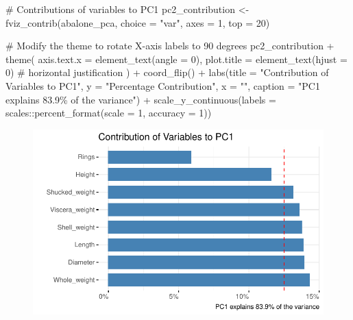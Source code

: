\documentclass[
  letterpaper,
  DIV=11,
  numbers=noendperiod]{scrreprt}
\newenvironment{Shaded}{\begin{snugshade}}{\end{snugshade}}
\newcommand{\AttributeTok}[1]{\textcolor[rgb]{0.40,0.45,0.13}{#1}}
\newcommand{\CommentTok}[1]{\textcolor[rgb]{0.37,0.37,0.37}{#1}}
\newcommand{\DecValTok}[1]{\textcolor[rgb]{0.68,0.00,0.00}{#1}}
\newcommand{\FunctionTok}[1]{\textcolor[rgb]{0.28,0.35,0.67}{#1}}
\newcommand{\NormalTok}[1]{\textcolor[rgb]{0.00,0.23,0.31}{#1}}
\newcommand{\OtherTok}[1]{\textcolor[rgb]{0.00,0.23,0.31}{#1}}
\newcommand{\SpecialCharTok}[1]{\textcolor[rgb]{0.37,0.37,0.37}{#1}}
\newcommand{\StringTok}[1]{\textcolor[rgb]{0.13,0.47,0.30}{#1}}
\begin{document}
\begin{Shaded}
\begin{Highlighting}[]
\CommentTok{\# Contributions of variables to PC1}
\NormalTok{pc2\_contribution }\OtherTok{\textless{}{-}} \FunctionTok{fviz\_contrib}\NormalTok{(abalone\_pca, }\AttributeTok{choice =} \StringTok{"var"}\NormalTok{, }\AttributeTok{axes =} \DecValTok{1}\NormalTok{, }\AttributeTok{top =} \DecValTok{20}\NormalTok{)}

\CommentTok{\# Modify the theme to rotate X{-}axis labels to 90 degrees}
\NormalTok{pc2\_contribution }\SpecialCharTok{+}
  \FunctionTok{theme}\NormalTok{(}
    \AttributeTok{axis.text.x =} \FunctionTok{element\_text}\NormalTok{(}\AttributeTok{angle =} \DecValTok{0}\NormalTok{),}
    \AttributeTok{plot.title =} \FunctionTok{element\_text}\NormalTok{(}\AttributeTok{hjust =} \DecValTok{0}\NormalTok{)  }\CommentTok{\# horizontal justification}
\NormalTok{  ) }\SpecialCharTok{+}
  \FunctionTok{coord\_flip}\NormalTok{() }\SpecialCharTok{+}
  \FunctionTok{labs}\NormalTok{(}\AttributeTok{title =} \StringTok{"Contribution of Variables to PC1"}\NormalTok{,}
       \AttributeTok{y =} \StringTok{"Percentage Contribution"}\NormalTok{,}
       \AttributeTok{x =} \StringTok{""}\NormalTok{,}
       \AttributeTok{caption =} \StringTok{"PC1 explains 83.9\% of the variance"}\NormalTok{) }\SpecialCharTok{+}
  \FunctionTok{scale\_y\_continuous}\NormalTok{(}\AttributeTok{labels =}\NormalTok{ scales}\SpecialCharTok{::}\FunctionTok{percent\_format}\NormalTok{(}\AttributeTok{scale =} \DecValTok{1}\NormalTok{,}
                                                     \AttributeTok{accuracy =} \DecValTok{1}\NormalTok{))}
\end{Highlighting}
\end{Shaded}

\begin{figure}[H]

{\centering \includegraphics{examples_files/figure-pdf/unnamed-chunk-13-1.pdf}

}

\end{figure}
\end{document}
